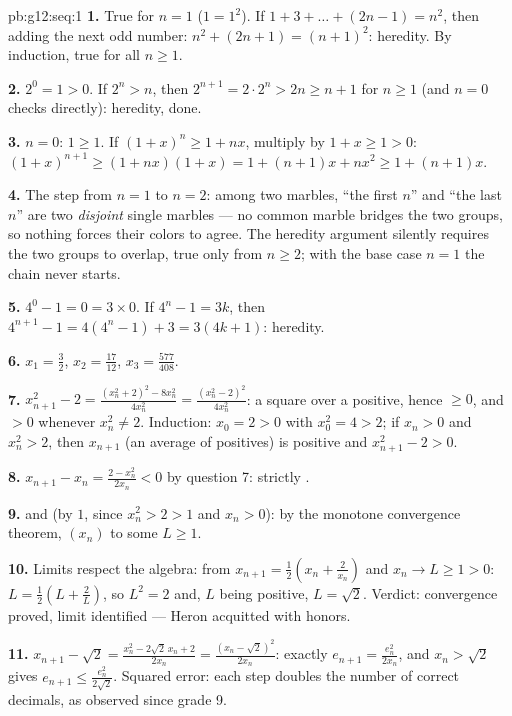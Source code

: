 \begin{solution}{pb:g12:seq:1}
\textbf{1.} True for $n = 1$ ($1 = 1^2$). If
$1 + 3 + \dots + (2n - 1) = n^2$, then adding the next odd
number: $n^2 + (2n + 1) = (n + 1)^2$: heredity. By induction,
true for all $n \geq 1$.

\textbf{2.} $2^0 = 1 > 0$. If $2^n > n$, then
$2^{n+1} = 2 \cdot 2^n > 2n \geq n + 1$ for $n \geq 1$ (and
$n = 0$ checks directly): heredity, done.

\textbf{3.} $n = 0$: $1 \geq 1$. If
$(1 + x)^n \geq 1 + nx$, multiply by $1 + x \geq 1 > 0$:
$(1 + x)^{n+1} \geq (1 + nx)(1 + x) = 1 + (n + 1)x + nx^2
\geq 1 + (n + 1)x$.

\textbf{4.} The step from $n = 1$ to $n = 2$: among two
marbles, ``the first $n$'' and ``the last $n$'' are two
\emph{disjoint} single marbles --- no common marble bridges the
two groups, so nothing forces their colors to agree. The
heredity argument silently requires the two groups to overlap,
true only from $n \geq 2$; with the base case $n = 1$ the chain
never starts.

\textbf{5.} $4^0 - 1 = 0 = 3 \times 0$. If $4^n - 1 = 3k$,
then $4^{n+1} - 1 = 4(4^n - 1) + 3 = 3(4k + 1)$: heredity.

\textbf{6.} $x_1 = \frac32$, $x_2 = \frac{17}{12}$,
$x_3 = \frac{577}{408}$.

\textbf{7.} $x_{n+1}^2 - 2 = \frac{(x_n^2 + 2)^2 - 8x_n^2}
{4x_n^2} = \frac{(x_n^2 - 2)^2}{4 x_n^2}$: a square over a
positive, hence $\geq 0$, and $> 0$ whenever $x_n^2 \neq 2$.
Induction: $x_0 = 2 > 0$ with $x_0^2 = 4 > 2$; if $x_n > 0$
and $x_n^2 > 2$, then $x_{n+1}$ (an average of positives) is
positive and $x_{n+1}^2 - 2 > 0$.

\textbf{8.} $x_{n+1} - x_n = \frac{2 - x_n^2}{2x_n} < 0$ by
question 7: strictly .

\textbf{9.}  and  (by $1$, since
$x_n^2 > 2 > 1$ and $x_n > 0$): by the monotone convergence
theorem, $(x_n)$  to some $L \geq 1$.

\textbf{10.} Limits respect the algebra: from
$x_{n+1} = \frac12\left(x_n + \frac{2}{x_n}\right)$ and
$x_n \to L \geq 1 > 0$:
$L = \frac12\left(L + \frac2L\right)$, so $L^2 = 2$ and, $L$
being positive, $L = \sqrt2$. Verdict: convergence proved,
limit identified --- Heron acquitted with honors.

\textbf{11.} $x_{n+1} - \sqrt2 = \frac{x_n^2 - 2\sqrt2\,x_n +
2}{2x_n} = \frac{(x_n - \sqrt2)^2}{2x_n}$: exactly
$e_{n+1} = \frac{e_n^2}{2x_n}$, and $x_n > \sqrt2$ gives
$e_{n+1} \leq \frac{e_n^2}{2\sqrt2}$. Squared error: each step
doubles the number of correct decimals, as observed since
grade 9.


\end{solution}
